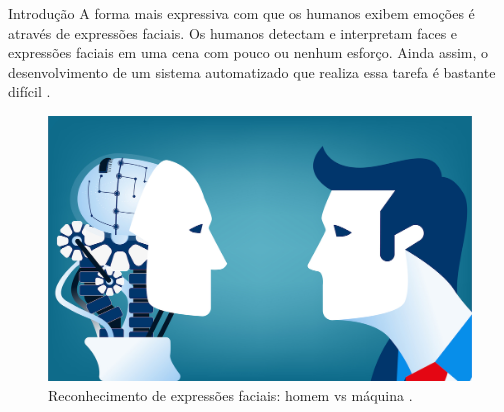 \begin{frame}{Introdução}
A forma \alert{mais expressiva} com que os humanos exibem emoções é através de \alert{expressões faciais}. Os humanos detectam e interpretam faces e expressões faciais em uma cena com \alert{pouco ou nenhum esforço}. Ainda assim, o desenvolvimento de um sistema automatizado que realiza essa tarefa é bastante difícil \cite{fasel2003automatic}.

  \begin{figure}
    \centering
    \includegraphics[scale=0.1]{img/human_vs_computer.jpeg}
    \caption{Reconhecimento de expressões faciais: homem vs máquina \cite{francis-school}.}
  \end{figure}

\end{frame}

